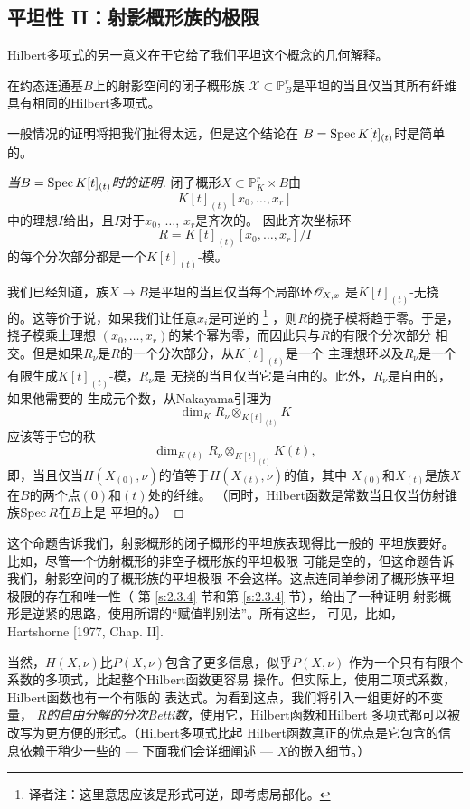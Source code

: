 \subsection{平坦性 II：射影概形族的极限}\label{s:3.3.2}

Hilbert多项式的另一意义在于它给了我们平坦这个概念的几何解释。


\begin{pro}\label{pro:3.56}
在约态连通基$B$上的射影空间的闭子概形族
$\mathscr X\subset \mathbb P_B^r$是平坦的当且仅当其所有纤维
具有相同的Hilbert多项式。
\end{pro}

一般情况的证明将把我们扯得太远，但是这个结论在
$B=\operatorname{Spec} K[t]_{(t)}$时是简单的。

\begin{proof}[{当$B=\operatorname{Spec} K\lbrack t\rbrack_{(t)}$时的证明}]
闭子概形$X\subset \mathbb P_K^r\times B$由
\[
	K[t]_{(t)}[x_0,\dots,x_r]
\]
中的理想$I$给出，且$I$对于$x_0$, $\dots$, $x_r$是齐次的。
因此齐次坐标环
\[
	R=K[t]_{(t)}[x_0,\dots,x_r]/I
\]
的每个分次部分都是一个$K[t]_{(t)}$-模。

我们已经知道，族$X\to B$是平坦的当且仅当每个局部环$\mathscr{O}_{X,x}$
是$K[t]_{(t)}$-无挠的。这等价于说，如果我们让任意$x_i$是可逆的%
\footnote{译者注：这里意思应该是形式可逆，即考虑局部化。}%
，则$R$的挠子模将趋于零。于是，挠子模乘上理想
$(x_0,\dots,x_r)$的某个幂为零，而因此只与$R$的有限个分次部分
相交。但是如果$R_\nu$是$R$的一个分次部分，从$K[t]_{(t)}$是一个
主理想环以及$R_\nu$是一个有限生成$K[t]_{(t)}$-模，$R_\nu$是
无挠的当且仅当它是自由的。此外，$R_\nu$是自由的，如果他需要的
生成元个数，从Nakayama引理为
\[
	\dim_K R_\nu \otimes_{K[t]_{(t)}}K
\]
应该等于它的秩
\[
	\dim_{K(t)}R_\nu  \otimes_{K[t]_{(t)}}K(t),
\]
即，当且仅当$H(X_{(0)},\nu)$的值等于$H(X_{(t)},\nu)$的值，其中
$X_{(0)}$和$X_{(t)}$是族$X$在$B$的两个点$(0)$和$(t)$处的纤维。
（同时，Hilbert函数是常数当且仅当仿射锥族$\operatorname{Spec} R$在$B$上是
平坦的。）
\end{proof}

这个命题告诉我们，射影概形的闭子概形的平坦族表现得比一般的
平坦族要好。比如，尽管一个仿射概形的非空子概形族的平坦极限
可能是空的，但这命题告诉我们，射影空间的子概形族的平坦极限
不会这样。这点连同单参闭子概形族平坦极限的存在和唯一性（
第 \ref{s:2.3.4} 节和第 \ref{s:2.3.4} 节），给出了一种证明
射影概形是逆紧的思路，使用所谓的“赋值判别法”。所有这些，
可见，比如，Hartshorne [1977, Chap. II].

当然，$H(X,\nu)$比$P(X,\nu)$包含了更多信息，似乎$P(X,\nu)$
作为一个只有有限个系数的多项式，比起整个Hilbert函数更容易%
操作。但实际上，使用二项式系数，Hilbert函数也有一个有限的
表达式。为看到这点，我们将引入一组更好的不变量，\textit{
$R$的自由分解的分次Betti数}，使用它，Hilbert函数和Hilbert
多项式都可以被改写为更方便的形式。（Hilbert多项式比起
Hilbert函数真正的优点是它包含的信息依赖于稍少一些的 ---
下面我们会详细阐述 --- $X$的嵌入细节。）

